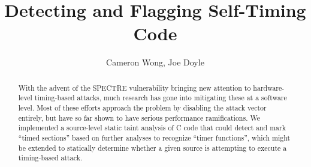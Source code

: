 \documentclass[12pt]{article}
\title{Detecting and Flagging Self-Timing Code}
\author{Cameron Wong, Joe Doyle}
\begin{document}
\maketitle

\begin{abstract}
  With the advent of the SPECTRE vulnerability bringing new attention to
  hardware-level timing-based attacks, much research has gone into mitigating
  these at a software level. Most of these efforts approach the problem by
  disabling the attack vector entirely, but have so far shown to have serious
  performance ramifications. We implemented a source-level static taint
  analysis of C code that could detect and mark ``timed sections'' based on
  further analyses to recognize ``timer functions'', which might be extended to
  statically determine whether a given source is attempting to execute a
  timing-based attack.
\end{abstract}
\end{document}
